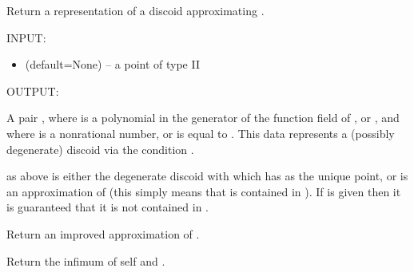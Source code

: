 \documentclass[letterpaper,10pt,english]{sphinxmanual}
\begin{document}
\begin{fulllineitems}
\begin{fulllineitems}
\end{fulllineitems}


\begin{fulllineitems}
\label{berkovich_line:mclf.berkovich.berkovich_line.TypeIPointOnBerkovichLine.discoid}
Return a representation of a discoid approximating .

INPUT:
\begin{itemize}
\item {} 
 (default=None) -- a point of type II

\end{itemize}

OUTPUT:

A pair , where  is a polynomial in the generator  of the
function field of , or , and where  is a nonrational number,
or is equal to .
This data represents a (possibly degenerate) discoid  via the condition
.

 as above is either the degenerate discoid with  which has
 as the unique point, or  is an approximation of 
(this simply means that  is contained in ). If
 is given then it is guaranteed that it is not
contained in .

\end{fulllineitems}


\begin{fulllineitems}
\label{berkovich_line:mclf.berkovich.berkovich_line.TypeIPointOnBerkovichLine.improved_approximation}
Return an improved approximation of .

\end{fulllineitems}


\begin{fulllineitems}
\label{berkovich_line:mclf.berkovich.berkovich_line.TypeIPointOnBerkovichLine.infimum}
Return the infimum of self and .


\end{fulllineitems}
\end{fulllineitems}
\end{document}
